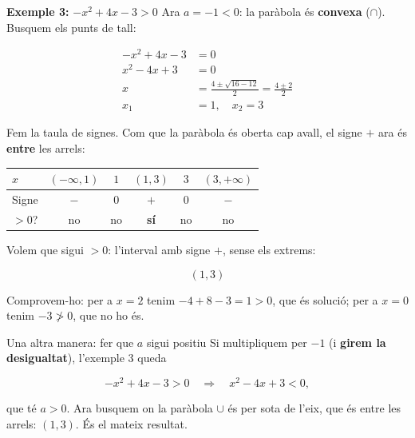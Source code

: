 \begin{exemple}{\textbf{Exemple 3:} $-x^2+4x-3>0$}
Ara $a=-1<0$: la paràbola és \textbf{convexa} ($\cap$). Busquem els punts de tall:

\[
\begin{aligned}
-x^2+4x-3&=0\\
x^2-4x+3&=0\\
x&=\frac{4\pm\sqrt{16-12}}{2}=\frac{4\pm 2}{2}\\
x_1&=1,\quad x_2=3
\end{aligned}
\]

\begin{center}
\end{center}

Fem la taula de signes. Com que la paràbola és oberta cap avall, el signe $+$ ara és \textbf{entre} les arrels:

\begin{center}
\begin{tabular}{lccccc}
\toprule
$x$ & $(-\infty,1)$ & $1$ & $(1,3)$ & $3$ & $(3,+\infty)$ \\
\midrule
Signe & $-$ & $0$ & $+$ & $0$ & $-$ \\
$>0$? & no & no & \textbf{sí} & no & no \\
\bottomrule
\end{tabular}
\end{center}

Volem que sigui $>0$: l'interval amb signe $+$, sense els extrems:

\[
(1,3)
\]

Comprovem-ho: per a $x=2$ tenim $-4+8-3=1>0$, que és solució; per a $x=0$ tenim $-3\not>0$, que no ho és.
\end{exemple}

\begin{propietat}{Una altra manera: fer que $a$ sigui positiu}
Si multipliquem per $-1$ (i \textbf{girem la desigualtat}), l'exemple 3 queda

\[
-x^2+4x-3>0 \quad\Rightarrow\quad x^2-4x+3<0,
\]

que té $a>0$. Ara busquem on la paràbola $\cup$ és per sota de l'eix, que és entre les arrels: $(1,3)$. És el mateix resultat.
\end{propietat}

